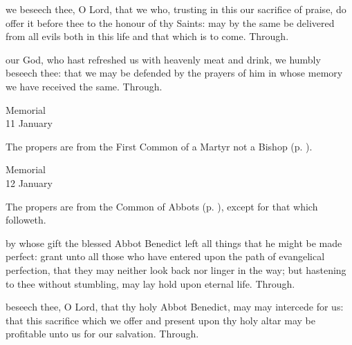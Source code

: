 
\secret
{} we beseech thee, O Lord, that we who, trusting in this our sacrifice of praise, do offer it before thee to the honour of thy Saints: may by the same be delivered from all evils both in this life and that which is to come. Through.


\postcommunion
{} our God, who hast refreshed us with heavenly meat and drink, we humbly beseech thee: that we may be defended by the prayers of him in whose memory we have received the same. Through.


\begin{inhead}
    {Memorial\\
11 January}
\end{inhead}

\begin{rubric}
	The propers are from the First Common of a Martyr not a Bishop (p. \pageref{CommonMartyrNotBishopI}).
\end{rubric}


\begin{inhead}
    {Memorial\\
12 January}
\end{inhead}

\begin{rubric}
	The propers are from the Common of Abbots (p. \pageref{CommonAbbots}), except for that which followeth.
\end{rubric}

\collect
{} by whose gift the blessed Abbot Benedict left all things that he might be made perfect: grant unto all those who have entered upon the path of evangelical perfection, that they may neither look back nor linger in the way; but hastening to thee without stumbling, may lay hold upon eternal life. Through.

\secret
{} beseech thee, O Lord, that thy holy Abbot Benedict, may may intercede for us: that this sacrifice which we offer and present upon thy holy altar may be profitable unto us for our salvation. Through.

